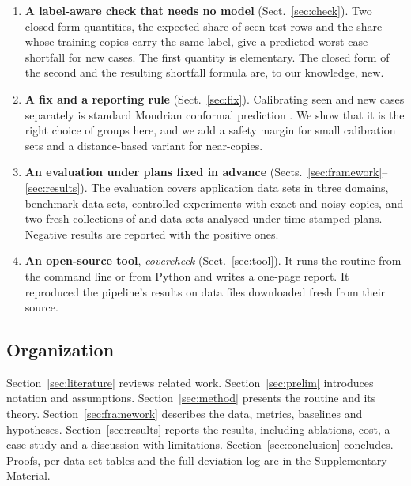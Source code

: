 \begin{enumerate}
\item \textbf{A label-aware check that needs no model} (Sect.~\ref{sec:check}). Two closed-form quantities, the expected share of seen test rows and the share whose training copies carry the same label, give a predicted worst-case shortfall for new cases. The first quantity is elementary. The closed form of the second and the resulting shortfall formula are, to our knowledge, new.
\item \textbf{A fix and a reporting rule} (Sect.~\ref{sec:fix}). Calibrating seen and new cases separately is standard Mondrian conformal prediction \citep{vovk2022}. We show that it is the right choice of groups here, and we add a safety margin for small calibration sets and a distance-based variant for near-copies.
\item \textbf{An evaluation under plans fixed in advance} (Sects.~\ref{sec:framework}--\ref{sec:results}). The evaluation covers \NCsNFlagTotal{} application data sets in three domains, \NNTotal{} benchmark data sets, controlled experiments with exact and noisy copies, and two fresh collections of \NPrN{} and \NWTwoN{} data sets analysed under time-stamped plans. Negative results are reported with the positive ones.
\item \textbf{An open-source tool}, \emph{covercheck} (Sect.~\ref{sec:tool}). It runs the routine from the command line or from Python and writes a one-page report. It reproduced the pipeline's results on \NTvN{} data files downloaded fresh from their source.
\end{enumerate}

\subsection*{Organization}

Section~\ref{sec:literature} reviews related work. Section~\ref{sec:prelim} introduces notation and assumptions. Section~\ref{sec:method} presents the routine and its theory. Section~\ref{sec:framework} describes the data, metrics, baselines and hypotheses. Section~\ref{sec:results} reports the results, including ablations, cost, a case study and a discussion with limitations. Section~\ref{sec:conclusion} concludes. Proofs, per-data-set tables and the full deviation log are in the Supplementary Material.
